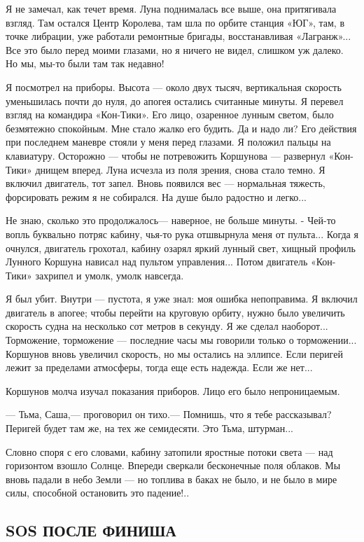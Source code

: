 \documentclass[11pt,a4paper,oneside]{article}
\begin{document}
Я не замечал, как течет время. Луна поднималась все выше, она притягивала взгляд. Там остался Центр Королева, там шла по орбите станция «ЮГ», там, в точке либрации, уже работали ремонтные бригады, восстанавливая «Лагранж»... Все это было перед моими глазами, но я ничего не видел, слишком уж далеко. Но мы, мы-то были там так недавно!

Я посмотрел на приборы. Высота — около двух тысяч, вертикальная скорость уменьшилась почти до нуля, до апогея остались считанные минуты. Я перевел взгляд на командира «Кон-Тики». Его лицо, озаренное лунным светом, было безмятежно спокойным. Мне стало жалко его будить. Да и надо ли? Его действия при последнем маневре стояли у меня перед глазами. Я положил пальцы на клавиатуру. Осторожно — чтобы не потревожить Коршунова — развернул «Кон-Тики» днищем вперед. Луна исчезла из поля зрения, снова стало темно. Я включил двигатель, тот запел. Вновь появился вес — нормальная тяжесть, форсировать режим я не собирался. На душе было радостно и легко...

Не знаю, сколько это продолжалось— наверное, не больше минуты. - Чей-то вопль буквально потряс кабину, чья-то рука отшвырнула меня от пульта... Когда я очнулся, двигатель грохотал, кабину озарял яркий лунный свет, хищный профиль Лунного Коршуна нависал над пультом управления... Потом двигатель «Кон-Тики» захрипел и умолк, умолк навсегда.

Я был убит. Внутри — пустота, я уже знал: моя ошибка непоправима. Я включил двигатель в апогее; чтобы перейти на круговую орбиту, нужно было увеличить скорость судна на несколько сот метров в секунду. Я же сделал наоборот... Торможение, торможение — последние часы мы говорили только о торможении... Коршунов вновь увеличил скорость, но мы остались на эллипсе. Если перигей лежит за пределами атмосферы, тогда еще есть надежда. Если же нет...

Коршунов молча изучал показания приборов. Лицо его было непроницаемым.

— Тьма, Саша,— проговорил он тихо.— Помнишь, что я тебе рассказывал? Перигей будет там же, на тех же семидесяти. Это Тьма, штурман...

Словно споря с его словами, кабину затопили яростные потоки света — над горизонтом взошло Солнце. Впереди сверкали бесконечные поля облаков. Мы вновь падали в небо Земли — но топлива в баках не было, и не было в мире силы, способной остановить это падение!..

\subsection{SOS ПОСЛЕ ФИНИША}
\label{sos}
\end{document}
